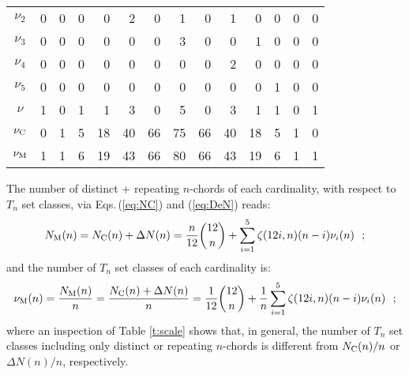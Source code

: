 \documentclass[12pt,a4paper]{article}
\begin{document}
\begin{table}
\begin{center}
\begin{tabular}{|c|r|r|r|r|r|r|r|r|r|r|r|r|r|}
$\nu_2$               & \phantom{$$}0          & 0 &  0                  &  0                  &   2                  &   0 &   1 &   0 &   1                  &   0                 &  0                  &  0 &  0                     \\
$\nu_3$               & \phantom{$$}0          & 0 &  0                  &  0                  &   0                  &   0 &   3 &   0 &   0                  &   1                 &  0                  &  0 &  0                     \\
$\nu_4$               & \phantom{$$}0          & 0 &  0                  &  0                  &   0                  &   0 &   0 &   0 &   2                  &   0                 &  0                  &  0 &  0                     \\
$\nu_5$               & \phantom{$$}0          & 0 &  0                  &  0                  &   0                  &   0 &   0 &   0 &   0                  &   0                 &  1                  &  0 &  0                     \\
$\nu$                 & \phantom{$$}1          & 0 &  1                  &  1                  &   3                  &   0 &   5 &   0 &   3                  &   1                 &  1                  &  0 &  1                     \\
$\nu_{\rm C}$         & \phantom{$$}0          & 1 &  5                  & 18                  &  40                  &  66 &  75 &  66 &  40                  &  18                 &  5                  &  1 &  0                     \\
$\nu_{\rm M}$         & \phantom{$$}1          & 1 &  6                  & 19                  &  43                  &  66 &  80 &  66 &  43                  &  19                 &  6                  &  1 &  1                     \\
\hline                            
\end{tabular}                     
\end{center}                      
\end{table}                       
%                                 

The number of distinct + repeating $n$-chords of each cardinality,
with respect to $T_n$ set classes, via Eqs.\,(\ref{eq:NC}) and (\ref{eq:DeN})
reads:
\begin{equation}
\label{eq:NMCD}
N_{\rm M}(n)=N_{\rm C}(n)+\Delta N(n)=
\frac n{12}{12 \choose n}+\sum_{i=1}^5\zeta(12i,n)(n-i)\nu_i(n)~~;
\end{equation}
and the number of $T_n$ set classes of each cardinality is:
\begin{equation}
\label{eq:nMCD}
\nu_{\rm M}(n)=\frac{N_{\rm M}(n)}n=\frac{N_{\rm C}(n)+\Delta N(n)}n=
\frac 1{12}{12 \choose n}+\frac1n\sum_{i=1}^5\zeta(12i,n)(n-i)\nu_i(n)~~;
\end{equation}
where an inspection of Table \ref{t:scale} shows that, in general, the number
of $T_n$ set classes including only distinct or repeating $n$-chords is
different from $N_{\rm C}(n)/n$ or $\Delta N(n)/n$, respectively.
\end{document}
